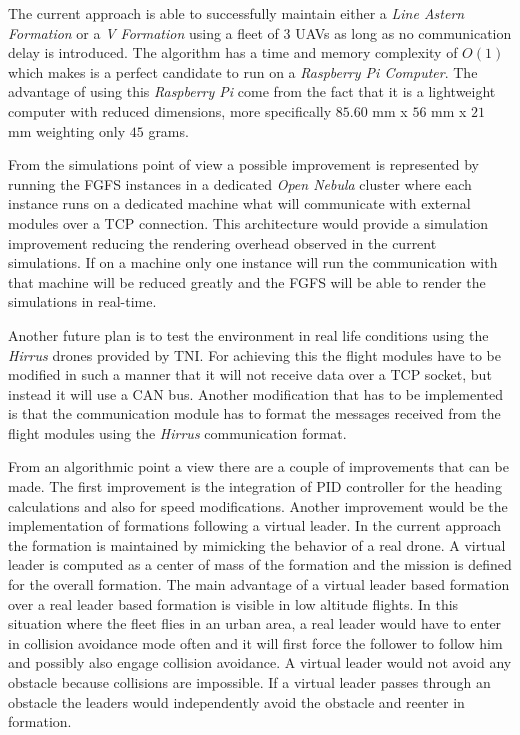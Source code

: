 The current approach is able to successfully maintain either a \textit{Line
Astern Formation} or a \textit{V Formation} using a fleet of 3 UAVs as long
as no communication delay is introduced. The algorithm has a time and memory
complexity of $O(1)$ which makes is a perfect candidate to run on a \textit{Raspberry
Pi Computer}. The advantage of using this \textit{Raspberry Pi} come from the
fact that it is a lightweight computer with reduced dimensions,  more specifically
$85.60$ mm x $56$ mm x $21$ mm weighting only $45$ grams.

From the simulations point of view a possible improvement is represented by running
the FGFS instances in a dedicated \textit{Open Nebula} cluster  where each instance
runs on a dedicated machine what will communicate with external modules over 
a TCP connection. This architecture would provide a simulation improvement 
reducing the rendering overhead observed in the current simulations. If on 
a machine only one instance will run the communication with that machine will
be reduced greatly and the FGFS will be able to render the simulations in 
real-time.

Another future plan is to test the environment in real life conditions
using the \textit{Hirrus} drones provided by TNI. For achieving this the 
flight modules have to be modified in such a manner that it will not receive
data over a TCP socket, but instead it will use a CAN bus. Another modification
that has to be implemented is that the communication module has to format the 
messages received from the flight modules using the \textit{Hirrus} communication
format.

From an algorithmic point a view there are a couple of improvements that can 
be made. The first improvement is the integration of PID
controller for the heading calculations and also for speed modifications. Another
improvement would be the implementation of formations following a virtual leader.
In the current approach the formation is maintained by mimicking the behavior of 
a real drone. A virtual leader is computed as a center of mass of the formation
and the mission is defined for the overall formation. The main advantage of a
virtual leader based formation over a real leader based formation is visible 
in low altitude flights. In this situation where the fleet flies in an urban 
area,  a real leader would have to enter in collision avoidance mode often
and it will first force the follower to follow him and possibly also
engage collision avoidance. A virtual leader would not avoid any obstacle
because collisions are impossible. If a virtual leader passes through an obstacle
the leaders would independently avoid the obstacle and reenter in formation. 
